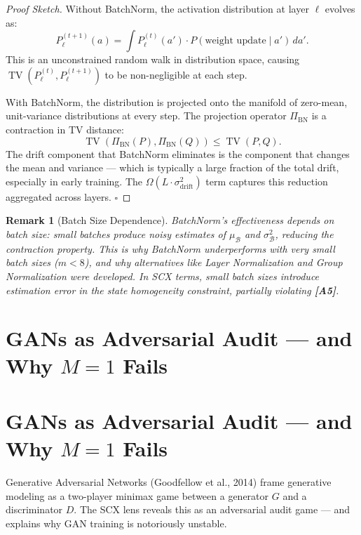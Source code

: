 \documentclass[12pt,a4paper]{article}
\newtheorem{remark}[theorem]{Remark}
\theoremstyle{definition}
\newcommand{\SCX}{\textsc{SCX}}
\DeclareMathOperator{\TV}{TV}
\newcommand{\asmTag}[1]{\textsf{\textbf{[A#1]}}}
\begin{document}
\begin{proof}[Proof Sketch]
Without BatchNorm, the activation distribution at layer $\ell$ evolves as:
\begin{equation}
    P_\ell^{(t+1)}(a) = \int P_\ell^{(t)}(a') \cdot P(\text{weight update} \mid a') \, da'.
\end{equation}
This is an unconstrained random walk in distribution space, causing $\TV(P_\ell^{(t)}, P_\ell^{(t+1)})$ to be non-negligible at each step.

With BatchNorm, the distribution is projected onto the manifold of zero-mean, unit-variance distributions at every step. The projection operator $\Pi_{\text{BN}}$ is a contraction in TV distance:
\begin{equation}
    \TV(\Pi_{\text{BN}}(P), \Pi_{\text{BN}}(Q)) \le \TV(P, Q).
\end{equation}
The drift component that BatchNorm eliminates is the component that changes the mean and variance — which is typically a large fraction of the total drift, especially in early training. The $\Omega(L \cdot \sigma_{\text{drift}}^2)$ term captures this reduction aggregated across layers. \hfill $\square$
\end{proof}

\begin{remark}[Batch Size Dependence]
BatchNorm's effectiveness depends on batch size: small batches produce noisy estimates of $\mu_{\mathcal{B}}$ and $\sigma_{\mathcal{B}}^2$, reducing the contraction property. This is why BatchNorm underperforms with very small batch sizes ($m < 8$), and why alternatives like Layer Normalization and Group Normalization were developed. In \SCX{} terms, small batch sizes introduce estimation error in the state homogeneity constraint, partially violating \asmTag{5}.
\end{remark}

\section{GANs as Adversarial Audit — and Why $M=1$ Fails}
\section{GANs as Adversarial Audit --- and Why $M=1$ Fails}
\label{sec:gans}

Generative Adversarial Networks (Goodfellow et al., 2014) frame generative modeling as a two-player minimax game between a generator $G$ and a discriminator $D$. The \SCX{} lens reveals this as an adversarial audit game — and explains why GAN training is notoriously unstable.
\end{document}
